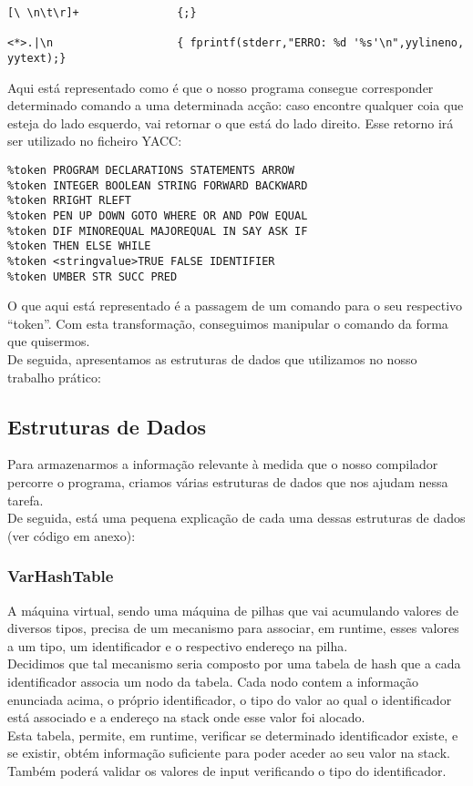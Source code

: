 \documentclass[12pt,a4paper,oneside]{article}
\newenvironment{codefold}{}{}
\begin{document}
\begin{codefold}
\begin{verbatim}
[\ \n\t\r]+               {;}

<*>.|\n                   { fprintf(stderr,"ERRO: %d '%s'\n",yylineno, yytext);}
\end{verbatim}

\indent Aqui está representado como é que o nosso programa consegue corresponder determinado comando a uma determinada acção: caso encontre qualquer coia que esteja do
lado esquerdo, vai retornar o que está do lado direito. Esse retorno irá ser utilizado no ficheiro YACC:

\begin{verbatim}
%token PROGRAM DECLARATIONS STATEMENTS ARROW
%token INTEGER BOOLEAN STRING FORWARD BACKWARD
%token RRIGHT RLEFT
%token PEN UP DOWN GOTO WHERE OR AND POW EQUAL
%token DIF MINOREQUAL MAJOREQUAL IN SAY ASK IF
%token THEN ELSE WHILE
%token <stringvalue>TRUE FALSE IDENTIFIER 
%token UMBER STR SUCC PRED
\end{verbatim}

\indent O que aqui está representado é a passagem de um comando para o seu respectivo ``token''. Com esta transformação, conseguimos manipular o comando da forma que
quisermos.\\
\indent De seguida, apresentamos as estruturas de dados que utilizamos no nosso trabalho prático:

  \subsection{Estruturas de Dados}
  
  \indent Para armazenarmos a informação relevante à medida que o nosso compilador percorre o programa, criamos várias estruturas de dados que nos ajudam nessa tarefa.\\
  \indent De seguida, está uma pequena explicação de cada uma dessas estruturas de dados (ver código em anexo):


    \subsubsection{VarHashTable}

\indent A máquina virtual, sendo uma máquina de pilhas que vai acumulando valores de diversos tipos, precisa de um mecanismo para associar, em runtime, esses valores a um
tipo, um identificador e o respectivo endereço na pilha.\\
\indent Decidimos que tal mecanismo seria composto por uma tabela de hash que a cada identificador associa um nodo da tabela. Cada nodo contem a informação enunciada
acima, o próprio identificador, o tipo do valor ao qual o identificador está associado e a endereço na stack onde esse valor foi alocado.\\
\indent Esta tabela, permite, em runtime, verificar se determinado identificador existe, e se existir, obtém informação suficiente para poder aceder ao seu valor na stack.
Também poderá validar os valores de input verificando o tipo do identificador.\\


\end{codefold}
\end{document}
